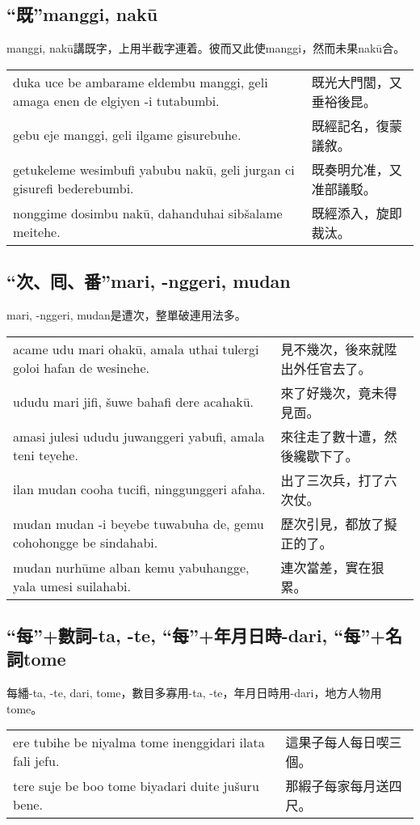 \documentclass{article}
\begin{document}
\subsection{“既”manggi, nak\={u}}
\noindent manggi, nak\={u}講既字，上用半截字連着。彼而又此使manggi，然而未果nak\={u}合。
\begin{center}
    \begin{tabularx}{\textwidth}{XX}
        duka uce be ambarame eldembu manggi, geli amaga enen de elgiyen -i tutabumbi. & 既光大門閭，又垂裕後昆。\\
        gebu eje manggi, geli ilgame gisurebuhe. & 既經記名，復蒙議敘。\\
        getukeleme wesimbufi yabubu nak\={u}, geli jurgan ci gisurefi bederebumbi. & 既奏明允准，又准部議駁。\\
        nonggime dosimbu nak\={u}, dahanduhai sib\v{s}alame meitehe. & 既經添入，旋即裁汰。
    \end{tabularx}
\end{center}

\subsection{“次、囘、番”mari, -nggeri, mudan}
\noindent mari, -nggeri, mudan是遭次，整單破連用法多。
\begin{center}
    \begin{tabularx}{\textwidth}{XX}
        acame udu mari ohak\={u}, amala uthai tulergi goloi hafan de wesinehe. & 見不幾次，後來就陞出外任官去了。\\
        ududu mari jifi, \v{s}uwe bahafi dere acahak\={u}. & 來了好幾次，竟未得見靣。\\
        amasi julesi ududu juwanggeri yabufi, amala teni teyehe. & 來往走了數十遭，然後纔歇下了。 \\
        ilan mudan cooha tucifi, ninggunggeri afaha. & 出了三次兵，打了六次仗。\\
        mudan mudan -i beyebe tuwabuha de, gemu cohohongge be sindahabi. & 歷次引見，都放了擬正的了。\\
        mudan nurh\={u}me alban kemu yabuhangge, yala umesi suilahabi. & 連次當差，實在狠累。
    \end{tabularx}
\end{center}

\subsection{“每”+數詞-ta, -te, “每”+年月日時-dari, “每”+名詞tome}
\noindent 每繙-ta, -te, dari, tome，數目多寡用-ta, -te，年月日時用-dari，地方人物用tome。
\begin{center}
    \begin{tabularx}{\textwidth}{XX}
        ere tubihe be niyalma tome inenggidari ilata fali jefu. & 這果子每人每日喫三個。\\
        tere suje be boo tome biyadari duite ju\v{s}uru bene. & 那縀子每家每月送四尺。
    \end{tabularx}
\end{center}
\end{document}
